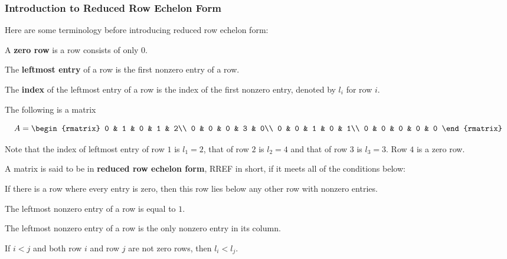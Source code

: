 \documentclass[a4paper,12pt]{article}
\begin{document}
\subsubsection{Introduction to Reduced Row Echelon Form}
Here are some terminology before introducing reduced row echelon form:\n

\begin{dft}
  \begin{alist}
    \item A \textbf{zero row} is a row consists of only $0$.
    \item The \textbf{leftmost entry} of a row is the first nonzero entry of a row.
    \item The \textbf{index} of the leftmost entry of a row is the index of the first nonzero entry, denoted by $l_{i}$ for row $i$.
  \end{alist}
\end{dft}\n

\begin{exm}
  The following is a matrix

  $$A=\begin{rmatrix}
  0 & 1 & 0 & 1 & 2\\
  0 & 0 & 0 & 3 & 0\\
  0 & 0 & 1 & 0 & 1\\
  0 & 0 & 0 & 0 & 0
  \end{rmatrix}$$\s

  Note that the index of leftmost entry of row $1$ is $l_{1}=2$, that of row $2$ is $l_{2}=4$ and that of row $3$ is $l_{3}=3$. Row $4$ is a zero row.
\end{exm}\n

\begin{dft}
  A matrix is said to be in \textbf{reduced row echelon form}, RREF in short, if it meets all of the conditions below:

  \begin{alist}
    \item If there is a row where every entry is zero, then this row lies below any other row with nonzero entries.
    \item The leftmost nonzero entry of a row is equal to $1$.
    \item The leftmost nonzero entry of a row is the only nonzero entry in its column.
    \item If $i<j$ and both row $i$ and row $j$ are not zero rows, then $l_{i}<l_{j}$.
  \end{alist}
\end{dft}\n
\end{document}

